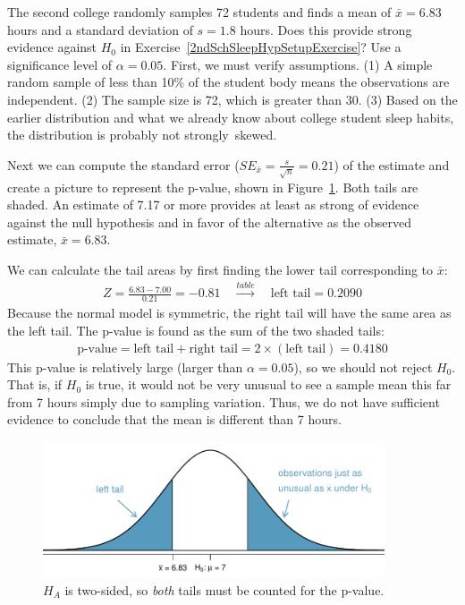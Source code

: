 \begin{example}{The second college randomly samples 72 students and finds a mean of $\bar{x} = 6.83$ hours and a standard deviation of $s=1.8$ hours. Does this provide strong evidence against $H_0$ in Exercise~\ref{2ndSchSleepHypSetupExercise}? Use a significance level of $\alpha=0.05$.}
First, we must verify assumptions. (1) A simple random sample of less than 10\% of the student body means the observations are independent. (2) The sample size is 72, which is greater than 30. (3) Based on the earlier distribution and what we already know about college student sleep habits, the distribution is probably not strongly~skewed.

Next we can compute the standard error ($SE_{\bar{x}} = \frac{s}{\sqrt{n}} = 0.21$) of the estimate and create a picture to represent the p-value, shown in Figure~\ref{2ndSchSleepHTExample}. Both tails are shaded. An estimate of 7.17 or more provides at least as strong of evidence against the null hypothesis and in favor of the alternative as the observed estimate, $\bar{x} = 6.83$.

We can calculate the tail areas by first finding the lower tail corresponding to $\bar{x}$:
\begin{eqnarray*}
Z = \frac{6.83 - 7.00}{0.21} = -0.81 \quad\stackrel{table}{\rightarrow}\quad \text{left tail}=0.2090
\end{eqnarray*}
Because the normal model is symmetric, the right tail will have the same area as the left tail. The p-value is found as the sum of the two shaded tails:
\begin{eqnarray*}
\text{p-value} = \text{left tail} + \text{right tail} = 2\times(\text{left tail}) = 0.4180
\end{eqnarray*}
This p-value is relatively large (larger than $\alpha=0.05$), so we should not reject $H_0$. That is, if $H_0$ is true, it would not be very unusual to see a sample mean this far from 7 hours simply due to sampling variation. Thus, we do not have sufficient evidence to conclude that the mean is different than 7 hours.


\begin{figure}
   \centering
   \includegraphics[width=0.9\textwidth]{04/figures/2ndSchSleepHTExample/2ndSchSleepHTExample}
   \caption{$H_A$ is two-sided, so \emph{both} tails must be counted for the p-value.}
   \label{2ndSchSleepHTExample}
\end{figure}

\end{example}

